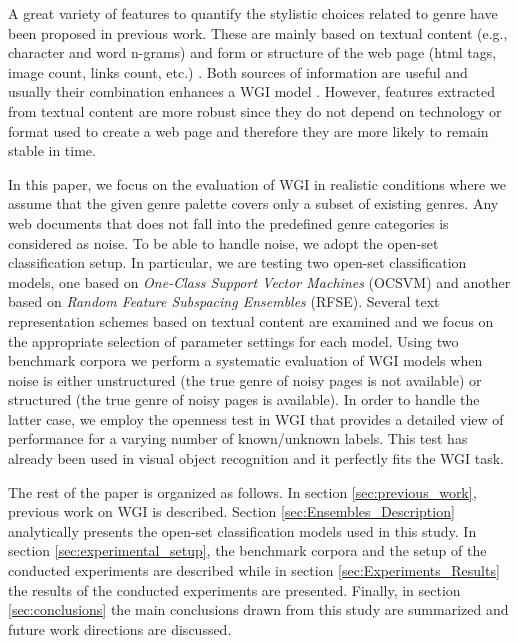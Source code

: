 \documentclass[
    11pt, %
    english, %
    singlespacing, %
    headsepline, %
]{DoctoralThesis} %
\begin{document}
A great variety of features to quantify the stylistic choices related to genre have been proposed in previous work. These are mainly based on textual content (e.g., character and word n-grams) \parencite{mason2009distance,Sharroff2010} and form or structure of the web page (html tags, image count, links count, etc.) \parencite{Lim2005,levering2008using}. Both sources of information are useful and usually their combination enhances a WGI model \parencite{kanaris2009learning}. However, features extracted from textual content are more robust since they do not depend on technology or format used to create a web page and therefore they are more likely to remain stable in time.

In this paper, we focus on the evaluation of WGI in realistic conditions where we assume that the given genre palette covers only a subset of existing genres. Any web documents that does not fall into the predefined genre categories is considered as noise. To be able to handle noise, we adopt the open-set classification setup. In particular, we are testing two open-set classification models, one based on \textit{One-Class Support Vector Machines} (OCSVM) and another based on \textit{Random Feature Subspacing Ensembles} (RFSE). Several text representation schemes based on textual content are examined and we focus on the appropriate selection of parameter settings for each model. Using two benchmark corpora we perform a systematic evaluation of WGI models when noise is either unstructured (the true genre of noisy pages is not available) or structured (the true genre of noisy pages is available). In order to handle the latter case, we employ the openness test in WGI that provides a detailed view of performance for a varying number of known/unknown labels. This test has already been used in visual object recognition \parencite{scheirer2013toward} and it perfectly fits the WGI task.

The rest of the paper is organized as follows. In section \ref{sec:previous_work}, previous work on WGI is described. Section \ref{sec:Ensembles_Description} analytically presents the open-set classification models used in this study. In section \ref{sec:experimental_setup}, the  benchmark corpora and the setup of the conducted experiments are described while in section \ref{sec:Experiments_Results} the results of the conducted experiments are presented. Finally, in section \ref{sec:conclusions} the main conclusions drawn from this study are summarized and future work directions are discussed.










\printbibliography[heading=bibintoc]
\end{document}
